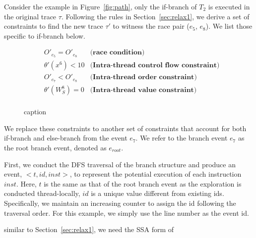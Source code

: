 Consider the example in Figure~\ref{fig:path}, only the if-branch of $T_2$ is executed in the original trace $\tau$.
Following the rules in Section~\ref{sec:relax1},   we derive a set of constraints to find the new trace $\tau'$ to witness the race pair ($e_5$, $e_8$). We list those specific to if-branch below.

\begin{figure}
	\begin{center}
$$
	\begin{array}{rcl}
		&  O'_{e_5}=O'_{e_8} & \textbf{(race condition)} \\
			& \theta'(x^6)<10 & \textbf{(Intra-thread control flow constraint)} \\
	&  O'_{e_7}<O'_{e_8} & \textbf{(Intra-thread order constraint)} \\
		& \theta'(W^8_S)=0 & \textbf{(Intra-thread value constraint)} \\
	\end{array} 
$$
\end{center}
caption{\label{fig:pathencode}}
\end{figure}


We  replace these constraints to another set of constraints that account for both if-branch and else-branch from the event $e_7$. We refer to the branch event $e_7$ as the root branch event, denoted as $e_{root}$.

First, we conduct the DFS traversal of the branch structure and produce an event, $<t, id, inst>$, to represent the potential execution of each instruction $inst$. Here, $t$ is the same as that of the root branch event as the exploration is conducted thread-locally, $id$ is a unique value different from existing ids. Specifically,  
 we maintain an increasing counter to assign the id following the traversal order. For this example, we simply use the line number as the event id.



similar to Section~\ref{sec:relax1}, we need the SSA form of 





